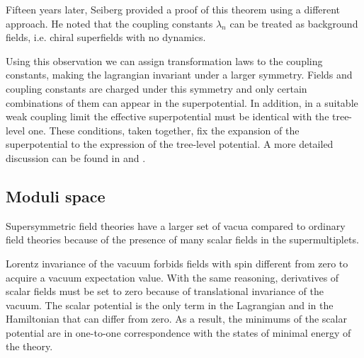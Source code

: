 Fifteen years later, Seiberg \cite{Seiberg:1993vc} provided a proof of this theorem using a different approach.
He noted that the coupling constants $\lambda_n$ can be treated as background fields, i.e. chiral superfields with no dynamics.

Using this observation we can assign transformation laws to the coupling constants, making the lagrangian invariant under a larger symmetry.
Fields and coupling constants are charged under this symmetry and only certain combinations of them can appear in the superpotential.
In addition, in a suitable weak coupling limit the effective superpotential must be identical with the tree-level one.
These conditions, taken together, fix the expansion of the superpotential to the expression of the tree-level potential.
A more detailed discussion can be found in \cite{Seiberg:1994bp} and \cite{Intriligator:1995au}.












\subsection{Moduli space}
Supersymmetric field theories have a larger set of vacua compared to ordinary field theories because of the presence of many scalar fields in the supermultiplets.

Lorentz invariance of the vacuum forbids fields with spin different from zero to acquire a vacuum expectation value.
With the same reasoning, derivatives of scalar fields must be set to zero because of translational invariance of the vacuum.
The scalar potential is the only term in the Lagrangian and in the Hamiltonian that can differ from zero.
As a result, the minimums of the scalar potential are in one-to-one correspondence with the states of minimal energy of the theory.


